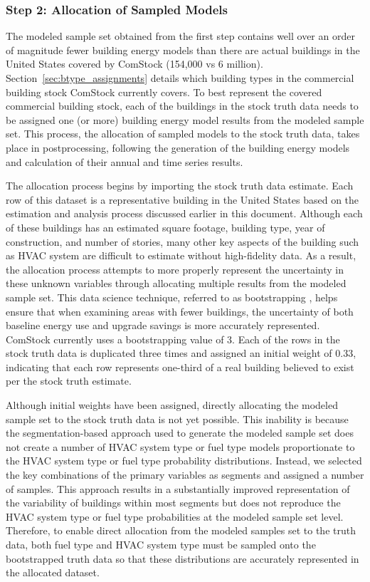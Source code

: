 \subsubsection{Step 2: Allocation of Sampled Models}
The modeled sample set obtained from the first step contains well over an order of magnitude fewer building energy models than there are actual buildings in the United States covered by ComStock (154,000 vs 6 million). Section~\ref{sec:btype_assignments} details which building types in the commercial building stock ComStock currently covers. To best represent the covered commercial building stock, each of the buildings in the stock truth data needs to be assigned one (or more) building energy model results from the modeled sample set. This process, the allocation of sampled models to the stock truth data, takes place in postprocessing, following the generation of the building energy models and calculation of their annual and time series results.

The allocation process begins by importing the stock truth data estimate. Each row of this dataset is a representative building in the United States based on the estimation and analysis process discussed earlier in this document. Although each of these buildings has an estimated square footage, building type, year of construction, and number of stories, many other key aspects of the building such as HVAC system are difficult to estimate without high-fidelity data. As a result, the allocation process attempts to more properly represent the uncertainty in these unknown variables through allocating multiple results from the modeled sample set. This data science technique, referred to as bootstrapping , helps ensure that when examining areas with fewer buildings, the uncertainty of both baseline energy use and upgrade savings is more accurately represented. ComStock currently uses a bootstrapping value of 3. Each of the rows in the stock truth data is duplicated three times and assigned an initial weight of 0.33, indicating that each row represents one-third of a real building believed to exist per the stock truth estimate.

Although initial weights have been assigned, directly allocating the modeled sample set to the stock truth data is not yet possible. This inability is because the segmentation-based approach used to generate the modeled sample set does not create a number of HVAC system type or fuel type models proportionate to the HVAC system type or fuel type probability distributions. Instead, we selected the key combinations of the primary variables as segments and assigned a number of samples. This approach results in a substantially improved representation of the variability of buildings within most segments but does not reproduce the HVAC system type or fuel type probabilities at the modeled sample set level. Therefore, to enable direct allocation from the modeled samples set to the truth data, both fuel type and HVAC system type must be sampled onto the bootstrapped truth data so that these distributions are accurately represented in the allocated dataset.

